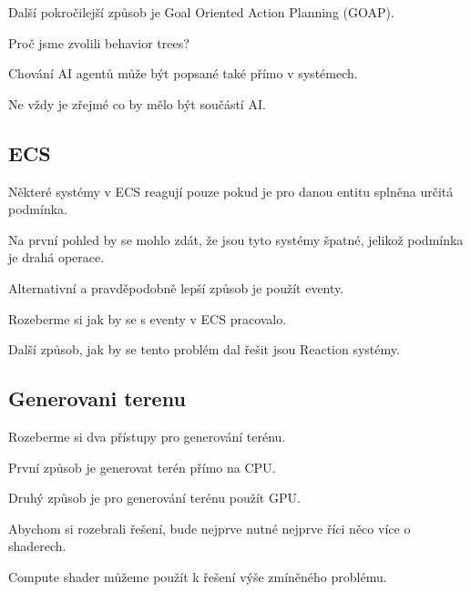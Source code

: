 Další pokročilejší způsob je Goal Oriented Action Planning (GOAP).

Proč jsme zvolili behavior trees?

Chování AI agentů může být popsané také přímo v systémech.

Ne vždy je zřejmé co by mělo být součástí AI.


\subsection{ECS}

Některé systémy v ECS reagují pouze pokud je pro danou entitu splněna určitá podmínka.

Na první pohled by se mohlo zdát, že jsou tyto systémy špatné, jelikož podmínka je drahá operace.

Alternativní a pravděpodobně lepší způsob je použít eventy.

Rozeberme si jak by se s eventy v ECS pracovalo.

Další způsob, jak by se tento problém dal řešit jsou Reaction systémy.


\subsection{Generovani terenu}

Rozeberme si dva přístupy pro generování terénu.

První způsob je generovat terén přímo na CPU.

Druhý způsob je pro generování terénu použít GPU.


Abychom si rozebrali řešení, bude nejprve nutné nejprve říci něco více o shaderech.

Compute shader můžeme použít k řešení výše zmíněného problému.

